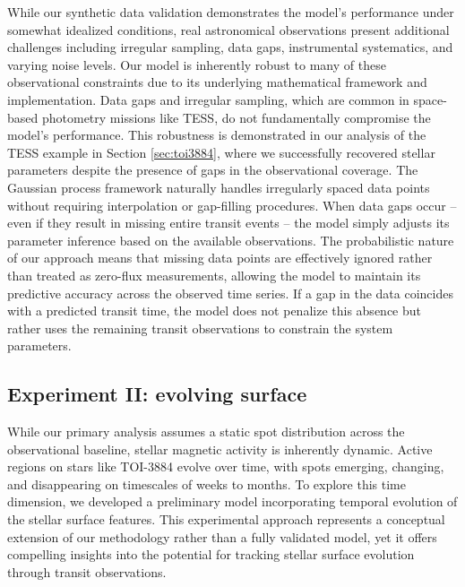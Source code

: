 \documentclass[twocolumn]{aastex631}
\newcommand{\sabinasays}[1]{{\color{purple}#1}}
\begin{document}
\sabinasays{While our synthetic data validation demonstrates the model's performance under somewhat idealized conditions, real astronomical 
observations present additional challenges including irregular sampling, data gaps, instrumental systematics, and varying noise levels. 
Our model is inherently robust to many of these observational constraints due to its underlying mathematical framework and implementation.
Data gaps and irregular sampling, which are common in space-based photometry missions like TESS, do not fundamentally compromise the model's 
performance. This robustness is demonstrated in our analysis of the TESS example in Section \ref{sec:toi3884}, where we successfully recovered 
stellar parameters despite the presence of gaps in the observational coverage. The Gaussian process framework naturally handles 
irregularly spaced data points without requiring interpolation or gap-filling procedures. When data gaps occur -- even if they result in 
missing entire transit events -- the model simply adjusts its parameter inference based on the available observations. The probabilistic nature 
of our approach means that missing data points are effectively ignored rather than treated as zero-flux measurements, allowing the model 
to maintain its predictive accuracy across the observed time series. If a gap in the data coincides with a predicted transit time, 
the model does not penalize this absence but rather uses the remaining transit observations to constrain the system parameters.}


\subsection{Experiment II: evolving surface}
\label{sec:experiment2}

While our primary analysis assumes a static spot distribution across the observational baseline, stellar magnetic activity is 
inherently dynamic. Active regions on stars like TOI-3884 evolve over time, with spots emerging, changing, and disappearing on 
timescales of weeks to months. To explore this time dimension, we developed a preliminary model incorporating temporal 
evolution of the stellar surface features. This experimental approach represents a conceptual extension of our methodology 
rather than a fully validated model, yet it offers compelling insights into the potential for tracking stellar surface evolution 
through transit observations.
\end{document}
